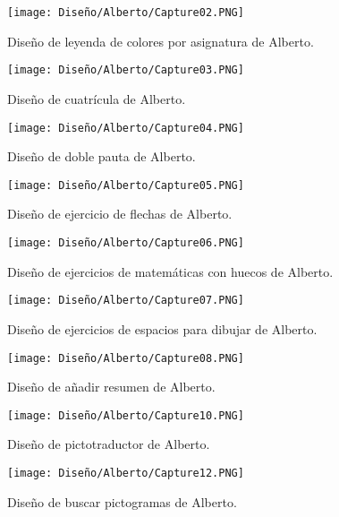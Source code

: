 \begin{figure}[ht!]
  \centering
  \texttt{[image: Diseño/Alberto/Capture02.PNG]}
  \caption{Diseño de leyenda de colores por asignatura de Alberto.}


\end{figure}
\begin{figure}[ht!]
  \centering
  \texttt{[image: Diseño/Alberto/Capture03.PNG]}
  \caption{Diseño de cuatrícula de Alberto.}


\end{figure}
\begin{figure}[ht!]
  \centering
  \texttt{[image: Diseño/Alberto/Capture04.PNG]}
  \caption{Diseño de doble pauta de Alberto.}


\end{figure}
\begin{figure}[ht!]
  \centering
  \texttt{[image: Diseño/Alberto/Capture05.PNG]}
  \caption{Diseño de ejercicio de flechas de Alberto.}


\end{figure}
\begin{figure}[ht!]
  \centering
  \texttt{[image: Diseño/Alberto/Capture06.PNG]}
  \caption{Diseño de ejercicios de matemáticas con huecos de Alberto.}


\end{figure}
\begin{figure}[ht!]
  \centering
  \texttt{[image: Diseño/Alberto/Capture07.PNG]}
  \caption{Diseño de ejercicios de espacios para dibujar de Alberto.}


\end{figure}
\begin{figure}[ht!]
  \centering
  \texttt{[image: Diseño/Alberto/Capture08.PNG]}
  \caption{Diseño de añadir resumen de Alberto.}




\end{figure}
\begin{figure}[ht!]
  \centering
  \texttt{[image: Diseño/Alberto/Capture10.PNG]}
  \caption{Diseño de pictotraductor de Alberto.}



\end{figure}
\begin{figure}[ht!]
  \centering
  \texttt{[image: Diseño/Alberto/Capture12.PNG]}
  \caption{Diseño de buscar pictogramas de Alberto.}


\end{figure}
